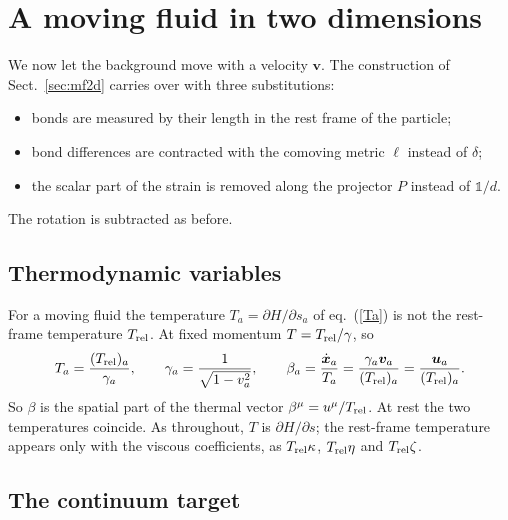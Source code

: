 \documentclass[11pt,aps,preprint,nofootinbib,superscriptaddress,tightenlines]{revtex4-2}
\def\st{\begin{equation}}
\def\stp{\end{equation}}
\def\Eq#1{eq.~(\ref{#1})}
\def\Sect#1{Sect.~\ref{#1}}
\newcommand{\one}{\mathds{1}}
\begin{document}
\section{A moving fluid in two dimensions}
\label{sec:moving2d}

We now let the background move with a velocity $\bm v$.  The
construction of \Sect{sec:mf2d} carries over with three substitutions:
\begin{itemize}
\item bonds are measured by their length in the rest frame of the particle;
\item bond differences are contracted with the comoving metric $\ell$ instead of $\delta$;
\item the scalar part of the strain is removed along the projector $P$ instead of $\one/d$.
\end{itemize}
The rotation is subtracted as before.

\subsection{Thermodynamic variables}

For a moving fluid the temperature $T_a=\partial H/\partial s_a$ of
\Eq{Ta} is not the rest-frame temperature $T_{\rm rel}$.  At fixed momentum
$T=T_{\rm rel}/\gamma$, so
\st
T_a=\frac{(T_{\rm rel})_a}{\gamma_a},\qquad
\gamma_a=\frac{1}{\sqrt{1-v_a^2}},\qquad
\beta_a=\frac{\dot{\bm x}_a}{T_a}=\frac{\gamma_a\bm v_a}{(T_{\rm rel})_a}=\frac{\bm u_a}{(T_{\rm rel})_a}.
\stp
So $\beta$ is the spatial part of the thermal vector $\beta^\mu=u^\mu/T_{\rm rel}$.  At
rest the two temperatures coincide.  As throughout, $T$ is $\partial H/\partial s$;
the rest-frame temperature appears only with the viscous coefficients, as
$T_{\rm rel}\kappa$, $T_{\rm rel}\eta$ and $T_{\rm rel}\zeta$.

\subsection{The continuum target}
\end{document}
